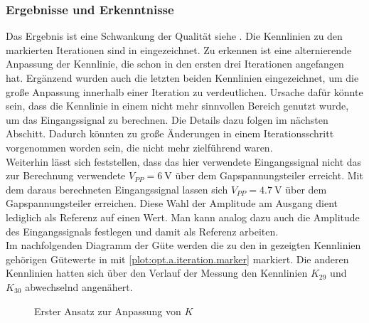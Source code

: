 \documentclass[../Report.tex]{subfiles}
\begin{document}
\subsubsection*{Ergebnisse und Erkenntnisse}
\label{subsubsec:opt.adjusta.results}
Das Ergebnis ist eine Schwankung der Qualität siehe . Die Kennlinien zu den markierten Iterationen sind in  eingezeichnet. Zu erkennen ist eine alternierende Anpassung der Kennlinie, die schon in den ersten drei Iterationen angefangen hat. 
Ergänzend wurden auch die letzten beiden Kennlinien eingezeichnet, um die große Anpassung innerhalb einer Iteration zu verdeutlichen. Ursache dafür könnte sein, dass die Kennlinie in einem nicht mehr sinnvollen Bereich genutzt wurde, um das Eingangssignal zu berechnen. Die Details dazu folgen im nächsten Abschitt. Dadurch könnten zu große Änderungen in einem Iterationsschritt vorgenommen worden sein, die nicht mehr zielführend waren.
\\
Weiterhin lässt sich feststellen, dass das hier verwendete Eingangssignal nicht das zur Berechnung verwendete $V_{PP} = \SI{6}{\V}$ über dem Gapspannungsteiler erreicht. Mit dem daraus berechneten Eingangssignal lassen sich $V_{PP} = \SI{4,7}{\V}$ über dem Gapspannungsteiler erreichen. Diese Wahl der Amplitude am Ausgang dient lediglich als Referenz auf einen Wert. Man kann analog dazu auch die Amplitude des Eingangssignals festlegen und damit als Referenz arbeiten.
\\
Im nachfolgenden Diagramm der Güte werden die zu den in  gezeigten Kennlinien gehörigen Gütewerte in  mit \ref{plot:opt.a.iteration.marker} markiert. Die anderen Kennlinien hatten sich über den Verlauf der Messung den Kennlinien $K_{29}$ und $K_{30}$ abwechselnd angenähert.
\begin{figure}[H]
\begin{subfigure}{0.5 \textwidth}
    \newlength\figureheight
	\newlength\figurewidth
	\setlength\figureheight{7.5cm}
	\setlength\figurewidth{7.5cm}
    
	\label{fig:evaluate30K}
\end{subfigure}
\begin{subfigure}{0.5 \textwidth}
	\setlength\figureheight{7.5cm}
	\setlength\figurewidth{7.5cm}
    
	\label{fig:evaluate30Q}
\end{subfigure}
\label{fig:opt.evaluate30}
\caption{Erster Ansatz zur Anpassung von $K$}
\end{figure}
\end{document}
